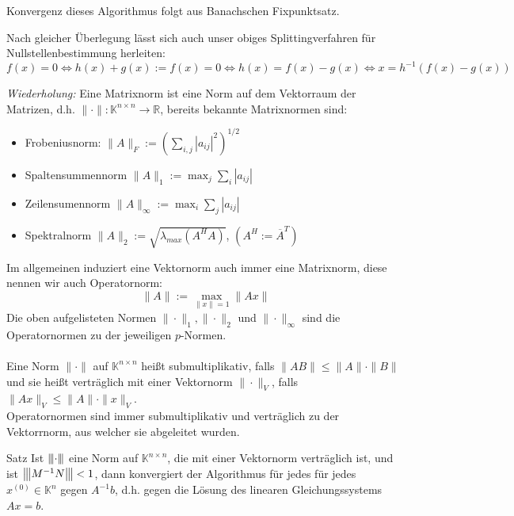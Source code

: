 \documentclass{article}
\begin{document}
Konvergenz dieses Algorithmus folgt aus Banachschen Fixpunktsatz.

\begin{rembox}
    Nach gleicher Überlegung lässt sich auch unser obiges Splittingverfahren für Nullstellenbestimmung herleiten:
    \[f(x)=0\Leftrightarrow h(x)+g(x):=f(x) = 0 \Leftrightarrow h(x)=f(x)-g(x) \Leftrightarrow x=h^{-1}(f(x)-g(x))\]
\end{rembox}
\textit{Wiederholung:} Eine Matrixnorm ist eine Norm auf dem Vektorraum der Matrizen, 
d.h. $\|\cdot\|:\mathbb{K}^{n\times n}\rightarrow \mathbb{R}$, bereits bekannte Matrixnormen sind:
\begin{itemize}
    \item Frobeniusnorm: $\|A\|_F := \left(\displaystyle \sum_{i,j}|a_{ij}|^2\right)^{1/2}$
    \item Spaltensummennorm $\|A\|_1:=\max_j \sum_i |a_{ij}|$
    \item Zeilensumennorm $\|A\|_\infty:=\max_i \sum_j |a_{ij}|$
    \item Spektralnorm $\|A\|_2:=\sqrt{\lambda_{max}(A^HA)}$, \qquad $(A^H := \overline{A}^T)$
\end{itemize}
Im allgemeinen induziert eine Vektornorm auch immer eine Matrixnorm, diese nennen wir auch Operatornorm:
\[\|A\|:=\max_{\|x\|=1}\|Ax\|\]
Die oben aufgelisteten Normen $\|\cdot\|_1,\|\cdot\|_2$ und $\|\cdot\|_\infty$ sind die Operatornormen zu 
der jeweiligen $p$-Normen. \\ \\
Eine Norm $\|\cdot\|$ auf $\mathbb{K}^{n\times n}$ heißt submultiplikativ, falls $\|AB\|\leq\|A\|\cdot\|B\|$ 
und sie heißt verträglich mit einer Vektornorm $\|\cdot\|_V$, falls $\|Ax\|_V\leq \|A\|\cdot\|x\|_V$. \\
Operatornormen sind immer submultiplikativ und verträglich zu der Vektorrnorm, aus welcher sie abgeleitet wurden.
\begin{thmbox}{Satz}
    Ist ${\left\vert\kern-0.25ex\left\vert\kern-0.25ex\left\vert \cdot \right\vert\kern-0.25ex\right\vert\kern-0.25ex\right\vert}$ eine Norm auf $\mathbb{K}^{n\times n}$, die mit einer Vektornorm verträglich ist, 
    und ist ${\left\vert\kern-0.25ex\left\vert\kern-0.25ex\left\vert M^{-1}N \right\vert\kern-0.25ex\right\vert\kern-0.25ex\right\vert}<1$, dann konvergiert der Algorithmus für jedes für jedes $x^{(0)}\in\mathbb{K}^n$ 
    gegen $A^{-1}b$, d.h. gegen die Lösung des linearen Gleichungssystems $Ax=b$.
\end{thmbox}
\end{document}
